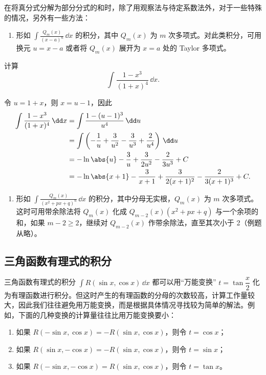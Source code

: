 在将真分式分解为部分分式的和时，除了用观察法与待定系数法外，对于一些特殊的情况，另外有一些方法：

\begin{enumerate}
  \item 形如 $\displaystyle\int\frac{Q_m(x)}{(x-a)^n}\,\dd x$ 的积分，其中 $Q_m(x)$ 为 $m$ 次多项式。对此类积分，可用换元 $u=x-a$ 或者将 $Q_m(x)$ 展开为 $x=a$ 处的 Taylor 多项式。
\end{enumerate}

\begin{xexample}[9.2.3]
计算
\[
  \int\frac{1-x^3}{(1+x)^4}\,\dd x.
\]
\end{xexample}

\begin{xsolution}
令 $u=1+x$，则 $x=u-1$，因此
\begin{align*}
  \int\frac{1-x^3}{(1+x)^4}\,\dd x
  &=\int\frac{1-(u-1)^3}{u^4}\,\dd u\\
  &=\int\left(-\frac1u+\frac3{u^2}-\frac3{u^3}+\frac2{u^4}\right)\,\dd u\\
  &=-\ln\abs{u}-\frac3u+\frac3{2u^2}-\frac2{3u^3}+C\\
  &=-\ln\abs{x+1}-\frac3{x+1}+\frac3{2(x+1)^2}-\frac2{3(x+1)^3}+C.
\end{align*}
\end{xsolution}

\begin{enumerate}[resume]
  \item 形如 $\displaystyle\int\frac{Q_m(x)}{(x^2+px+q)^n}\,\dd x$ 的积分，其中分母无实根，$Q_m(x)$ 为 $m$ 次多项式。这时可用带余除法将 $Q_m(x)$ 化成 $Q_{m-2}(x)(x^2+px+q)$ 与一个余项的和，如果 $m-2\ge2$，继续对 $Q_{m-2}(x)$ 作带余除法，直至其次小于 2（例题从略）。
\end{enumerate}

\subsection{三角函数有理式的积分}

三角函数有理式的积分 $\int R(\sin x,\cos x)\,\dd x$ 都可以用“万能变换” $t=\tan\dfrac x2$ 化为有理函数进行积分。但这时产生的有理函数的分母的次数较高，计算工作量较大，因此我们往往避免用万能变换，而是根据具体情况寻找较为简单的解法。例如，下面的几种变换的计算量往往比用万能变换要小：

\begin{enumerate}
  \item 如果 $R(-\sin x,\cos x)=-R(\sin x,\cos x)$，则令 $t=\cos x$；
  \item 如果 $R(\sin x,-\cos x)=-R(\sin x,\cos x)$，则令 $t=\sin x$；
  \item 如果 $R(-\sin x,-\cos x)=R(\sin x,\cos x)$，则令 $t=\tan x$。
\end{enumerate}

